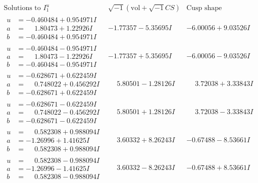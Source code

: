 \documentclass[1p]{elsarticle_modified}
\theoremstyle{definition}
\newcommand{\I}{\sqrt{-1}}
\begin{document}
$$\begin{array}{c|c|c}  
\text{Solutions to }I^u_{1}& \I (\text{vol} + \sqrt{-1}CS) & \text{Cusp shape}\\
 \hline 
\begin{aligned}
u &= -0.460484 + 0.954971 I \\
a &= \phantom{-}1.80473 + 1.22926 I \\
b &= -0.460484 + 0.954971 I\end{aligned}
 & -1.77357 - 5.35695 I & -6.00056 + 9.03526 I \\ \hline\begin{aligned}
u &= -0.460484 - 0.954971 I \\
a &= \phantom{-}1.80473 - 1.22926 I \\
b &= -0.460484 - 0.954971 I\end{aligned}
 & -1.77357 + 5.35695 I & -6.00056 - 9.03526 I \\ \hline\begin{aligned}
u &= -0.628671 + 0.622459 I \\
a &= \phantom{-}0.748022 + 0.456292 I \\
b &= -0.628671 + 0.622459 I\end{aligned}
 & \phantom{-}5.80501 - 1.28126 I & \phantom{-}3.72038 + 3.33843 I \\ \hline\begin{aligned}
u &= -0.628671 - 0.622459 I \\
a &= \phantom{-}0.748022 - 0.456292 I \\
b &= -0.628671 - 0.622459 I\end{aligned}
 & \phantom{-}5.80501 + 1.28126 I & \phantom{-}3.72038 - 3.33843 I \\ \hline\begin{aligned}
u &= \phantom{-}0.582308 + 0.988094 I \\
a &= -1.26996 + 1.41625 I \\
b &= \phantom{-}0.582308 + 0.988094 I\end{aligned}
 & \phantom{-}3.60332 + 8.26243 I & -0.67488 - 8.53661 I \\ \hline\begin{aligned}
u &= \phantom{-}0.582308 - 0.988094 I \\
a &= -1.26996 - 1.41625 I \\
b &= \phantom{-}0.582308 - 0.988094 I\end{aligned}
 & \phantom{-}3.60332 - 8.26243 I & -0.67488 + 8.53661 I \\ \hline\begin{aligned}

\end{aligned}
\end{array}$$
\end{document}

